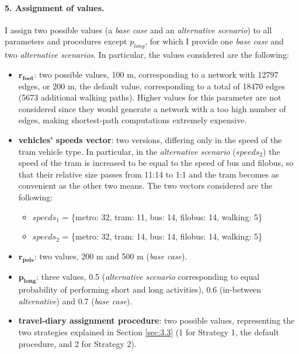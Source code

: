 \paragraph{5. Assignment of values.}
I assign two possible values (a \textit{base case} and an \textit{alternative scenario}) to all parameters and procedures except $p_{long}$, for which I provide one \textit{base case} and two \textit{alternative scenarios}. In particular, the values considered are the following:
\begin{itemize}
    \item $\mathbf{r_{foot}}$: two possible values, 100 m, corresponding to a network with 12797 edges, or 200 m, the default value, corresponding to a total of 18470 edges (5673 additional walking paths). Higher values for this parameter are not considered since they would generate a network with a too high number of edges, making shortest-path computations extremely expensive.
    \item \textbf{vehicles' speeds vector}: two versions, differing only in the speed of the tram vehicle type. In particular, in the \textit{alternative scenario} ($speeds_2$) the speed of the tram is increased to be equal to the speed of bus and filobus, so that their relative size passes from 11:14 to 1:1 and the tram becomes as convenient as the other two means. The two vectors considered are the following:
            \begin{itemize}
                \item $speeds_1$ = \{metro: 32, tram: 11, bus: 14, filobus: 14, walking: 5\}
                \item $speeds_2$ = \{metro: 32, tram: 14, bus: 14, filobus: 14, walking: 5\}
            \end{itemize}
    \item $\mathbf{r_{pois}}$: two values, 200 m and 500 m (\textit{base case}). 
    \item $\mathbf{p_{long}}$: three values, 0.5 (\textit{alternative scenario} corresponding to equal probability of performing short and long activities), 0.6 (in-between \textit{alternative}) and 0.7 (\textit{base case}).
    \item \textbf{travel-diary assignment procedure}: two possible values, representing the two strategies explained in Section \ref{sec:3.3} (1 for Strategy 1, the default procedure, and 2 for Strategy 2).
\end{itemize}

